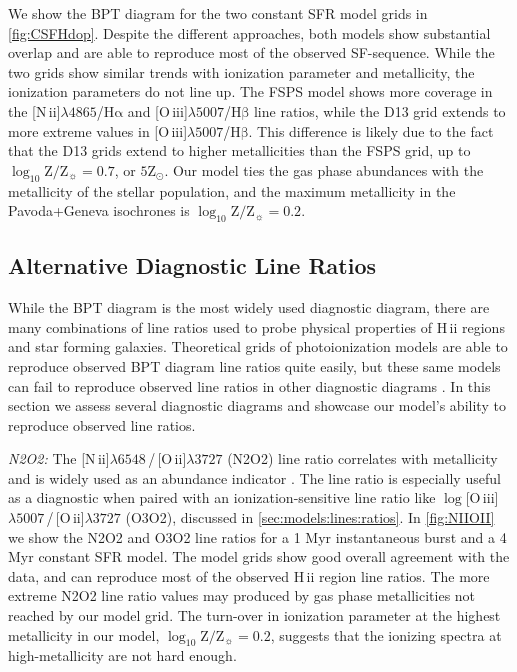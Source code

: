\documentclass[twocolumn, tighten]{aastex61}
\newcommand{\Fig}[1]{\autoref{fig:#1}}
\newcommand{\Sec}[1]{\autoref{sec:#1}}
\newcommand{\logten}{\ensuremath{\log_{10}}}
\newcommand{\nii}{[N\,{\sc ii}]\xspace}
\newcommand{\oiii}{[O\,{\sc iii}]\xspace}
\newcommand{\oii}{[O\,{\sc ii}]\xspace}
\newcommand{\ha}{\ensuremath{\mathrm{H\alpha}}}
\newcommand{\hb}{\ensuremath{\mathrm{H\beta}}}
\newcommand{\hii}{H\,{\sc ii}\xspace}
\newcommand\lam[1]{\ensuremath{\lambda #1}}
\newcommand{\logZeq}[1]{\ensuremath{\logten \mathrm{Z}/\mathrm{Z}_{\sun} = #1}}
\newcommand\niiha{\nii{}\lam{4865}/\ha{}}
\newcommand\oiiihb{\oiii{}\lam{5007}/\hb{}}
\begin{document}
We show the BPT diagram for the two constant SFR model grids in \Fig{CSFHdop}. Despite the different approaches, both models show substantial overlap and are able to reproduce most of the observed SF-sequence. While the two grids show similar trends with ionization parameter and metallicity, the ionization parameters do not line up. The FSPS model shows more coverage in the \niiha{} and \oiiihb{} line ratios, while the D13 grid extends to more extreme values in \oiiihb{}. This difference is likely due to the fact that the D13 grids extend to higher metallicities than the FSPS grid, up to \logZeq{0.7}, or $5\mathrm{Z}_{\odot}$. Our model ties the gas phase abundances with the metallicity of the stellar population, and the maximum metallicity in the Pavoda+Geneva isochrones is \logZeq{0.2}.

\subsection{Alternative Diagnostic Line Ratios}\label{sec:models:discussion}

While the BPT diagram is the most widely used diagnostic diagram, there are many combinations of line ratios used to probe physical properties of \hii regions and star forming galaxies. Theoretical grids of photoionization models are able to reproduce observed BPT diagram line ratios quite easily, but these same models can fail to reproduce observed line ratios in other diagnostic diagrams \citep[e.g., ][]{Telford16}. In this section we assess several diagnostic diagrams and showcase our model's ability to reproduce observed line ratios.

{\it N2O2:} The \nii\lam{6548}\,/\,\oii\lam{3727} (N2O2) line ratio correlates with metallicity and is widely used as an abundance indicator \citep{Levesque10, Dopita00, VO87}. The line ratio is especially useful as a diagnostic when paired with an ionization-sensitive line ratio like $\log$\oiii\lam{5007}\,/\,\oii\lam{3727} (O3O2), discussed in \Sec{models:lines:ratios}. In \Fig{NIIOII} we show the N2O2 and O3O2 line ratios for a 1 Myr instantaneous burst and a 4 Myr constant SFR model. The model grids show good overall agreement with the data, and can reproduce most of the observed \hii region line ratios. The more extreme N2O2 line ratio values may produced by gas phase metallicities not reached by our model grid. The turn-over in ionization parameter at the highest metallicity in our model, \logZeq{0.2}, suggests that the ionizing spectra at high-metallicity are not hard enough.
\end{document}

